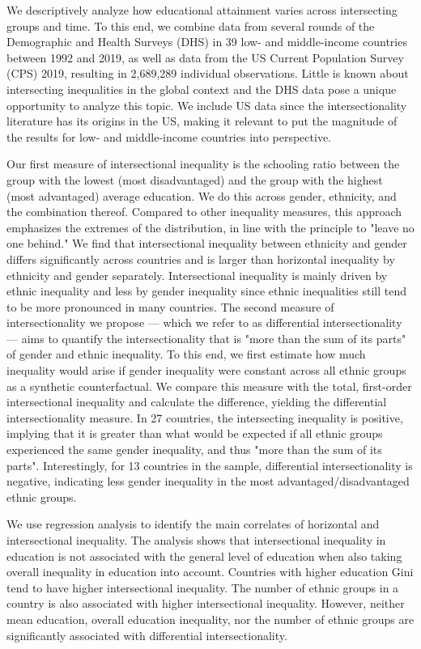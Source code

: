 We descriptively analyze how educational attainment varies across intersecting groups and time. To this end, we combine data from several rounds of the Demographic and Health Surveys (DHS) in 39 low- and middle-income countries between 1992 and 2019, as well as data from the US Current Population Survey (CPS) 2019, resulting in 2,689,289 individual observations. Little is known about intersecting inequalities in the global context and the DHS data pose a unique opportunity to analyze this topic. We include US data since the intersectionality literature has its origins in the US, making it relevant to put the magnitude of the results for low- and middle-income countries into perspective. 

Our first measure of intersectional inequality is the schooling ratio between the group with the lowest (most disadvantaged) and the group with the highest (most advantaged) average education. We do this across gender, ethnicity, and the combination thereof. Compared to other inequality measures, this approach emphasizes the extremes of the distribution, in line with the principle to "leave no one behind." We find that intersectional inequality between ethnicity and gender differs significantly across countries and is larger than horizontal inequality by ethnicity and gender separately. Intersectional inequality is mainly driven by ethnic inequality and less by gender inequality since ethnic inequalities still tend to be more pronounced in many countries. The second measure of intersectionality we propose --- which we refer to as differential intersectionality --- aims to quantify the intersectionality that is "more than the sum of its parts" of gender and ethnic inequality. To this end, we first estimate how much inequality would arise if gender inequality were constant across all ethnic groups as a synthetic counterfactual. We compare this measure with the total, first-order intersectional inequality and calculate the difference, yielding the differential intersectionality measure. In 27 countries, the intersecting inequality is positive, implying that it is greater than what would be expected if all ethnic groups experienced the same gender inequality, and thus "more than the sum of its parts". Interestingly, for 13 countries in the sample, differential intersectionality is negative, indicating less gender inequality in the most advantaged/disadvantaged ethnic groups. 

We use regression analysis to identify the main correlates of horizontal and intersectional inequality. The analysis shows that intersectional inequality in education is not associated with the general level of education when also taking overall inequality in education into account. Countries with higher education Gini tend to have higher intersectional inequality. The number of ethnic groups in a country is also associated with higher intersectional inequality. However, neither mean education, overall education inequality, nor the number of ethnic groups are significantly associated with differential intersectionality. 

